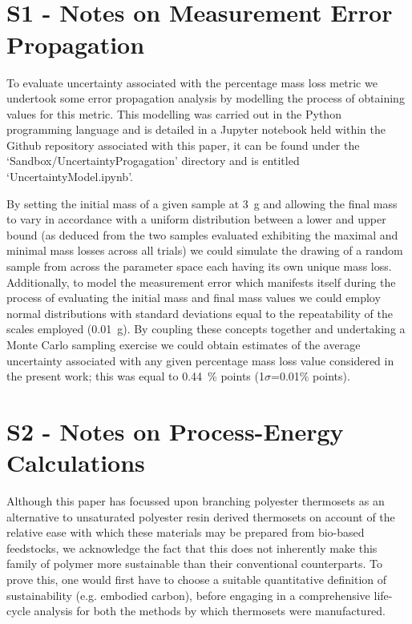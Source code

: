 \linenumbers
{}\\[1.5em]
\\[1em]

\section*{S1 - Notes on Measurement Error Propagation}
\label{sec:NoMEP}
To evaluate uncertainty associated with the percentage mass loss
 metric we undertook some error propagation analysis by modelling
 the process of obtaining values for this metric.
This modelling was carried out in the Python programming language
 and is detailed in a Jupyter notebook held within the Github
 repository associated with this paper, it can be found
 under the `Sandbox/UncertaintyProgagation' directory and is
 entitled `UncertaintyModel.ipynb'.

By setting the initial mass of a given sample at 3~\unit{\gram}
 and allowing the final mass to vary in accordance with a uniform
 distribution between a lower and upper bound (as deduced
 from the two samples evaluated exhibiting the maximal and minimal
 mass losses across all trials) we could simulate the drawing of
 a random sample from across the parameter space each having its own
 unique mass loss.
Additionally, to model the measurement error which manifests itself
 during the process of evaluating the initial mass and final mass
 values we could employ normal distributions with standard deviations
 equal to the repeatability of the scales employed (0.01~\unit{\gram}).
By coupling these concepts together and undertaking a Monte Carlo
 sampling exercise we could obtain estimates of the average
 uncertainty associated with any given percentage mass loss value
 considered in the present work; this was equal to 
 0.44~\% points (1\(\sigma\)=0.01\% points).


\section*{S2 - Notes on Process-Energy Calculations}
\label{sec:NoPEC}

Although this paper has focussed upon branching polyester
 thermosets as an alternative to unsaturated polyester resin
 derived thermosets on account of the relative ease with
 which these materials may be prepared from bio-based feedstocks,
 we acknowledge the fact that this does not inherently make this
 family of polymer more sustainable than their conventional
 counterparts.
To prove this, one would first have to choose a suitable 
 quantitative definition of sustainability (e.g. embodied carbon),
 before engaging in a comprehensive life-cycle analysis for both
 the methods by which thermosets were manufactured.

